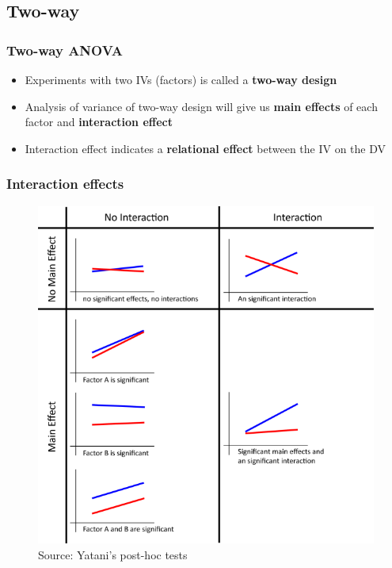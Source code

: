 \documentclass{beamer}
\begin{document}
\subsection{Two-way}

\begin{frame}
	\frametitle{Two-way ANOVA} 
	\begin{itemize}
		\item Experiments with two IVs (factors) is called a \textbf{two-way design}
		\item Analysis of variance of two-way design will give us \textbf{main effects} of each factor and \textbf{interaction effect}
		\item Interaction effect indicates a \textbf{relational effect} between the IV on the DV
	\end{itemize}
\end{frame}

\begin{frame}
	\frametitle{Interaction effects} 
		\begin{figure}
		\includegraphics[width=0.5\linewidth]{interactions}
		\caption{Source: Yatani's post-hoc tests}
	\end{figure}
\end{frame}
\end{document}
